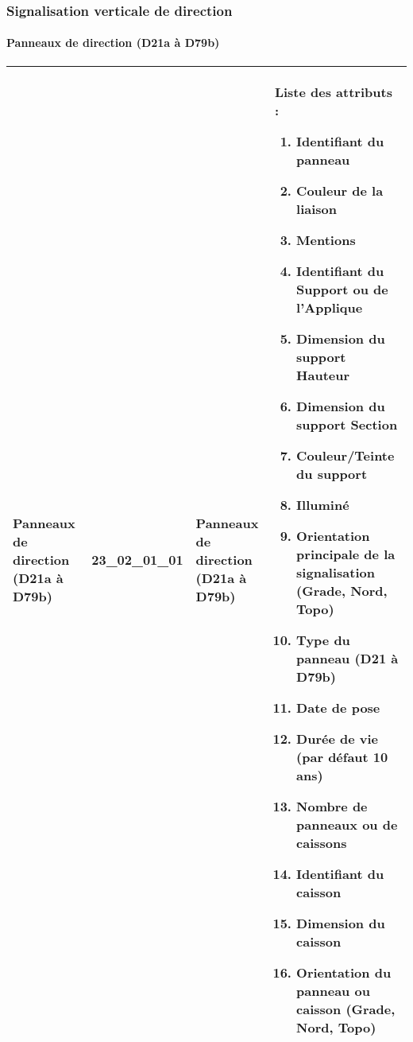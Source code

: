 \documentclass[12pt,titlepage]{book}
\begin{document}
\subsubsection{\large Signalisation verticale de direction}
\paragraph{Panneaux de direction (D21a à D79b)}
\noindent
\vspace{\baselineskip}

\renewcommand{\arraystretch}{1.2}
\begin{supertabular}{|p{10cm}|c|p{13cm}|p{12cm}|}
 Panneaux de direction (D21a à D79b) & 23\_02\_01\_01 & Panneaux de direction (D21a à D79b) & Liste des attributs :
\begin{enumerate}
  \item Identifiant du panneau  \item Couleur de la liaison  \item Mentions  \item Identifiant du Support ou de l'Applique  \item Dimension du support  Hauteur  \item Dimension du support Section  \item Couleur/Teinte du support  \item Illuminé  \item Orientation principale de la signalisation (Grade, Nord, Topo)  \item Type du panneau (D21 à D79b)  \item Date de pose  \item Durée de vie (par défaut 10 ans)  \item Nombre de panneaux ou de caissons  \item Identifiant du caisson  \item Dimension du caisson  \item Orientation du panneau ou caisson (Grade, Nord, Topo)\end{enumerate}
\\
\hline
\end{supertabular}
\end{document}
